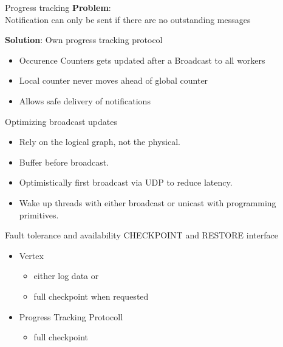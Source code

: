 \begin{frame}[t]{Progress tracking}
\vspace{0.15cm}
\textbf{Problem}: \\
\vspace{0.15cm}
Notification can only be sent if there are no outstanding messages

  \vspace{0.5cm}
  \textbf{Solution}: Own progress tracking protocol
  \begin{itemize}\setlength\itemsep{0.25cm}
     \item Occurence Counters gets updated after a Broadcast to all workers
     \item Local counter never moves ahead of global counter
    \item Allows safe delivery of notifications
   \end{itemize}

\end{frame}

\begin{frame}[t]{Optimizing broadcast updates}
  \vspace{0.15cm}
   \begin{itemize}\setlength\itemsep{0.25cm}
     \item Rely on the logical graph, not the physical.
     \item Buffer before broadcast.
     \item Optimistically first broadcast via UDP to reduce latency.
     \item Wake up threads with either broadcast or unicast with programming primitives.
   \end{itemize}

\end{frame}

 \begin{frame}[t]{Fault tolerance and availability}
  \vspace{0.15cm}
  CHECKPOINT and RESTORE interface
   \begin{itemize}\setlength\itemsep{0.25cm}
     \item Vertex
	 \begin{itemize}\setlength\itemsep{0.25cm}
	 	\item either log data or
        \item full checkpoint when requested
	 \end{itemize}
     \item Progress Tracking Protocoll
     \begin{itemize}\setlength\itemsep{0.25cm}
     	\item full checkpoint
     \end{itemize}
   \end{itemize}

\end{frame}



